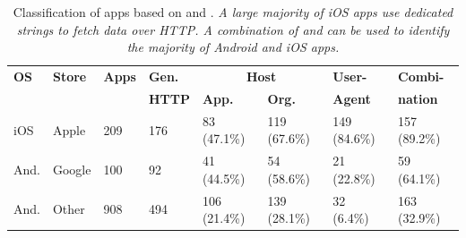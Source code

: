 



\begin{table} 
     \centering
     \begin{small}
     \begin{tabular}{|p{}|p{}|p{}|p{}|p{}|p{}|p{}|p{}|}
        \hline
        {\bf OS}&{\bf Store}&{\bf Apps}&{\bf Gen.}&\multicolumn{2}{|c|}{\bf Host} & {\bf User-}&{\bf Combi-} \tabularnewline
        \cline{5-6}    
             &        &     & {\bf HTTP} & {\bf App. } & {\bf Org.}& \bf{Agent}   & \bf{nation}  \tabularnewline                
        \hline    
        iOS  & Apple  & 209 & 176 & 83 (47.1\%)  &  119 (67.6\%)   &  149 (84.6\%)& 157 (89.2\%) \tabularnewline
        \hline
        And. & Google & 100 & 92  & 41 (44.5\%)  &  54 (58.6\%)    &  21 (22.8\%) &  59 (64.1\%)  \tabularnewline
        \hline    
        And. & Other  & 908 & 494 & 106 (21.4\%) & 139 (28.1\%)     &  32 (6.4\%)  &  163 (32.9\%)  \tabularnewline
        \hline
     \end{tabular}
     \end{small}
     \caption{Classification of apps based on \httphost and \useragent. \emph{A large majority of iOS apps use dedicated \useragent strings to fetch data over HTTP. A combination of \useragent and \httphost can be used to identify the majority of Android and iOS apps.} }
     \label{tab:classification-success}
\end{table}

